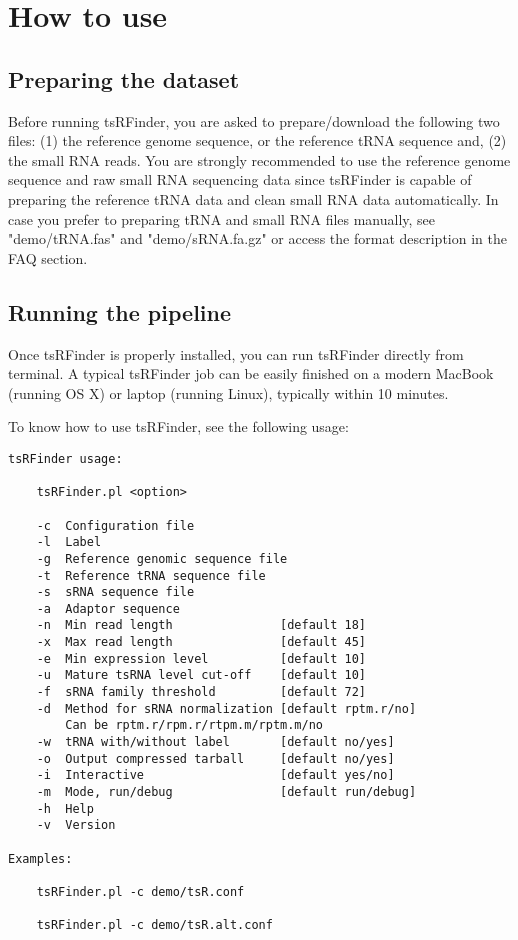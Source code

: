 \documentclass[11pt, a4paper]{article}
\begin{document}
\section{How to use}

\subsection{Preparing the dataset}

Before running tsRFinder, you are asked to prepare/download the following two files: (1) the reference genome sequence, or the reference tRNA sequence and, (2) the small RNA reads. You are strongly recommended to use the reference genome sequence and raw small RNA sequencing data since tsRFinder is capable of preparing the reference tRNA data and clean small RNA data automatically. In case you prefer to preparing tRNA and small RNA files manually, see "demo/tRNA.fas" and "demo/sRNA.fa.gz" or access the format description in the FAQ section.

\subsection{Running the pipeline}

Once tsRFinder is properly installed, you can run tsRFinder directly from terminal. A typical tsRFinder job can be easily finished on a modern MacBook (running OS X) or laptop (running Linux), typically within 10 minutes.

To know how to use tsRFinder, see the following usage:

{\scriptsize \begin{tcolorbox}[colback=blue!5!white,colframe=pink!75!black,title=Usage of tsRFinder: ./tsRFinder.pl -h]
\begin{verbatim}
tsRFinder usage:

    tsRFinder.pl <option>

    -c  Configuration file
    -l  Label
    -g  Reference genomic sequence file
    -t  Reference tRNA sequence file
    -s  sRNA sequence file
    -a  Adaptor sequence
    -n  Min read length               [default 18]
    -x  Max read length               [default 45]
    -e  Min expression level          [default 10]
    -u  Mature tsRNA level cut-off    [default 10]
    -f  sRNA family threshold         [default 72]
    -d  Method for sRNA normalization [default rptm.r/no]
        Can be rptm.r/rpm.r/rtpm.m/rptm.m/no
    -w  tRNA with/without label       [default no/yes]
    -o  Output compressed tarball     [default no/yes]
    -i  Interactive                   [default yes/no]
    -m  Mode, run/debug               [default run/debug]
    -h  Help
    -v  Version

Examples:

    tsRFinder.pl -c demo/tsR.conf

    tsRFinder.pl -c demo/tsR.alt.conf
\end{verbatim}
\end{tcolorbox}}
\end{document}
